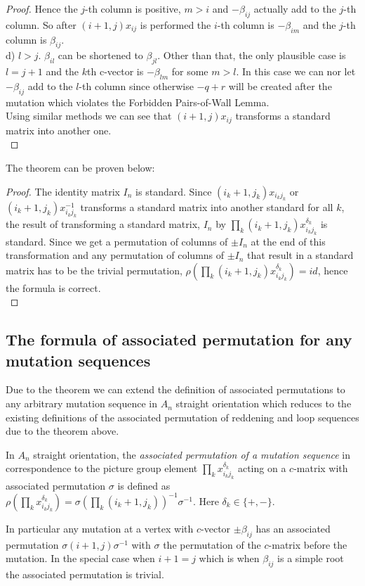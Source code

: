 \begin{proof}
\indent Hence the $j$-th column is positive, $m>i$ and $-\beta_{ij}$ actually add to the $j$-th column. So after $(i+1,j)x_{ij}$ is performed the $i$-th column is $-\beta_{im}$ and the $j$-th column is $\beta_{ij}$.\\
\indent d) $l>j$. $\beta_{il}$ can be shortened to $\beta_{jl}$. Other than that, the only plausible case is $l = j + 1$ and the $k$th c-vector is $-\beta_{lm}$ for some $m>l$. In this case we can nor let $-\beta_{ij}$ add to the $l$-th column since otherwise $-q+r$ will be created after the mutation which violates the Forbidden Pairs-of-Wall Lemma.\\
\indent Using similar methods we can see that $(i+1, j)x_{ij}$ transforms a standard matrix into another one.\\
\end{proof}
\indent The theorem can be proven below:\\
\begin{proof}
The identity matrix $I_n$ is standard. Since $(i_k+1,j_k)x_{i_kj_k}$ or $(i_k+1,j_k)x_{i_kj_k}^{-1}$ transforms a standard matrix into another standard for all $k$, the result of transforming a standard matrix, $I_n$ by $\prod_{k}(i_k+1,j_k)x_{i_kj_k}^{\delta_k}$ is standard. Since we get a permutation of columns of $\pm I_n$ at the end of this transformation and any permutation of columns of $\pm I_n$ that result in a standard matrix has to be the trivial permutation, $\rho(\prod_{k}(i_k+1,j_k)x_{i_kj_k}^{\delta_k})=id$, hence the formula is correct.\\
\end{proof}
\subsection{The formula of associated permutation for any mutation sequences}
\indent Due to the theorem we can extend the definition of associated permutations to any arbitrary mutation sequence in $A_n$ straight orientation which reduces to the existing definitions of the associated permutation of reddening and loop sequences due to the theorem above.
\begin{definition}
In $A_n$ straight orientation, the \textit{associated permutation of a mutation sequence} in correspondence to the picture group element $\prod_{k}x_{i_kj_k}^{\delta_k}$ acting on a $c$-matrix with associated permutation $\sigma$ is defined as $\rho(\prod_{k}x_{i_kj_k}^{\delta_k}) = \sigma(\prod_{k}(i_k+1,j_k))^{-1}\sigma^{-1}$. Here $\delta_k\in\{+,-\}$.\\
\end{definition}
\indent In particular any mutation at a vertex with $c$-vector $\pm\beta_{ij}$ has an associated permutation $\sigma(i+1,j)\sigma^{-1}$ with $\sigma$ the permutation of the $c$-matrix before the mutation. In the special case when $i+1=j$ which is when $\beta_{ij}$ is a simple root the associated permutation is trivial.\\ 